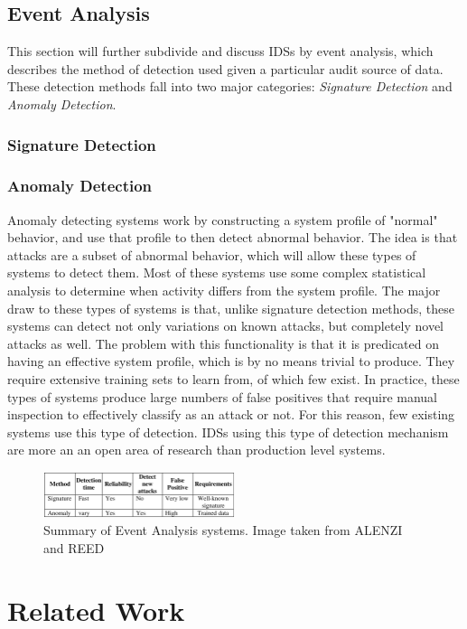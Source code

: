 \documentclass{acm_proc_article-sp}
\begin{document}
    \subsection{Event Analysis}
    	This section will further subdivide and discuss IDSs by event analysis, which describes the method of detection used given a particular audit source of data. These detection methods fall into two major categories: \emph{Signature Detection} and \emph{Anomaly Detection}.   
	    \subsubsection{Signature Detection}
    	\subsubsection{Anomaly Detection}
    		Anomaly detecting systems work by constructing a system profile of "normal" behavior, and use that profile to then detect abnormal behavior. The idea is that attacks are a subset of abnormal behavior, which will allow these types of systems to detect them. Most of these systems use some complex statistical analysis to determine when activity differs from the system profile. The major draw to these types of systems is that, unlike signature detection methods, these systems can detect not only variations on known attacks, but completely novel attacks as well. The problem with this functionality is that it is predicated on having an effective system profile, which is by no means trivial to produce. They require extensive training sets to learn from, of which few exist. In practice, these types of systems produce large numbers of false positives that require manual inspection to effectively classify as an attack or not. For this reason, few existing systems use this type of detection. IDSs using this type of detection mechanism are more an an open area of research than production level systems. 
    		\begin{figure}[h!]
		\centering
		\includegraphics[width=0.5\textwidth]{signatreVSanomaly.png}
		\caption{Summary of Event Analysis systems. Image taken from ALENZI and REED} %
		\label{comparison}
	\end{figure}
			

\section{Related Work}
\end{document}
